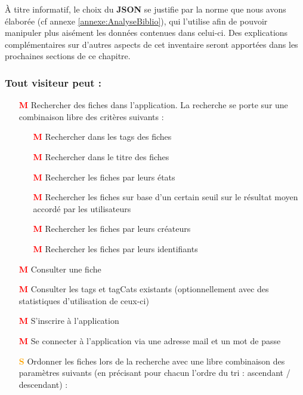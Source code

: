 À titre informatif, le choix du \textbf{JSON} se justifie par la norme que nous avons élaborée (cf annexe \ref{annexe:AnalyseBiblio}), qui l'utilise afin de pouvoir manipuler plus aisément les données contenues dans celui-ci.
Des explications complémentaires sur d'autres aspects de cet inventaire seront apportées dans les prochaines sections de ce chapitre.

\subsubsection*{Tout visiteur peut : }

\begin{itemize}
    \item[\textcolor{red}{\textbf{M}}] Rechercher des \glspl{fiche} dans l'application. La recherche se porte sur une combinaison libre des critères suivants : 
    \begin{itemize}
        \item[\textcolor{red}{\textbf{M}}] Rechercher dans les \glspl{tag} des \glspl{fiche}
        \item[\textcolor{red}{\textbf{M}}] Rechercher dans le titre des \glspl{fiche}
        \item[\textcolor{red}{\textbf{M}}] Rechercher les \glspl{fiche} par leurs états
        \item[\textcolor{red}{\textbf{M}}] Rechercher les \glspl{fiche} sur base d'un certain seuil sur le résultat moyen accordé par les utilisateurs
        \item[\textcolor{red}{\textbf{M}}] Rechercher les \glspl{fiche} par leurs créateurs
        \item[\textcolor{red}{\textbf{M}}] Rechercher les \glspl{fiche} par leurs identifiants
    \end{itemize}
        \item[\textcolor{red}{\textbf{M}}] Consulter une \gls{fiche}
    \item[\textcolor{red}{\textbf{M}}] Consulter les \glspl{tag} et \glspl{tagCat} existants (optionnellement avec des statistiques d'utilisation de ceux-ci)
    \item[\textcolor{red}{\textbf{M}}] S'inscrire à l'application
    \item[\textcolor{red}{\textbf{M}}] Se connecter à l'application via une adresse mail et un mot de passe
    \item[\textcolor{orange}{\textbf{S}}] Ordonner les \glspl{fiche} lors de la recherche avec une libre combinaison des paramètres suivants (en précisant pour chacun l'ordre du tri : ascendant / descendant) :

\end{itemize}
